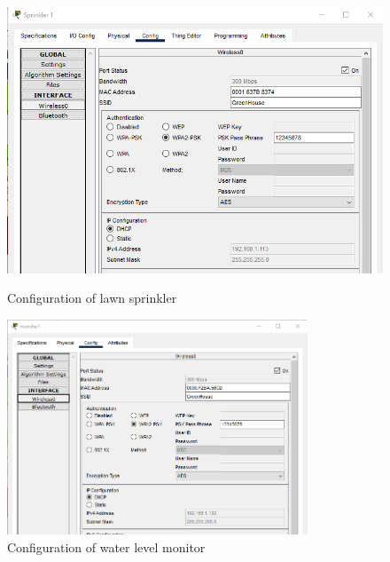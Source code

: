 \documentclass{report}
\begin{document}
\begin{figure}[h]
    \centering
    
    \begin{minipage}{0.45\textwidth}
    \centering
    \includegraphics[width=1\textwidth]{iot/1d.png}
    \caption{Configuration of lawn sprinkler}
    \label{fig:3}
    \end{minipage}
    \hfill
    \begin{minipage}{0.45\textwidth}
    \centering
    \includegraphics[width=0.8\textwidth]{iot/3d.png}
    \caption{Configuration of water level monitor}
    \label{fig:4}
    \end{minipage}  
    

\end{figure}
\end{document}
